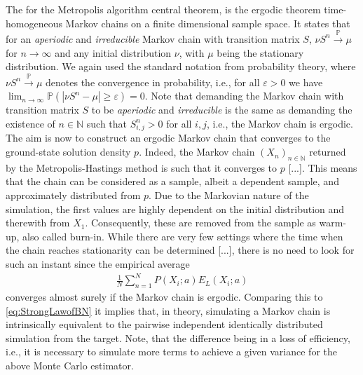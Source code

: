 \documentclass[11pt,a4paper]{article}
\numberwithin{equation}{section}
\begin{document}
%
The for the Metropolis algorithm central theorem, is the ergodic theorem time-homogeneous Markov chains on a finite dimensional sample space. 
%
It states that for an {\it aperiodic} and {\it irreducible} Markov chain with transition matrix $S$, $\nu S^n\overset{\mathbb{P}}{\longrightarrow}\mu$ for $n\to \infty$ and any initial distribution $\nu$, with $\mu$ being the stationary distribution.
%
We again used the standard notation from probability theory, where $\nu S^n\overset{\mathbb{P}}{\longrightarrow}\mu$  denotes the convergence in probability, i.e., for all $\varepsilon > 0 $ we have $\lim_{n\to \infty}\mathbb{P}(|\nu S^n - \mu|\geq\varepsilon)=0$. 
%
Note that demanding the Markov chain with transition matrix $S$ to be {\it aperiodic} and {\it irreducible} is the same as demanding the existence of $n\in\mathbb{N}$ such that $S^n_{i,j}>0$ for all $i,j$, i.e., the Markov chain is ergodic.\\  

%
The aim is now to construct an ergodic Markov chain that converges to the ground-state solution density $p$.
%
Indeed, the Markov chain $(X_{n})_{n\in\mathbb{N}}$ returned by the Metropolis-Hastings method is such that it converges to $p$ [...]. 
%
This means that the chain can be considered as a sample, albeit a dependent sample, and approximately distributed from $p$. 
%
Due to the Markovian nature of the simulation, the first values are highly dependent on the initial distribution and therewith from $X_1$.
%
Consequently, these are removed from the sample as warm-up, also called burn-in. 
%
While there are very few settings where the time when the chain reaches stationarity can be determined [...], there is no need to look for such an instant since the empirical average
\begin{align*}
\frac{1}{N}\sum_{n=1}^NP(X_i;a)E_L(X_i;a)
\end{align*}
converges almost surely if the Markov chain is ergodic. 
%
Comparing this to \eqref{eq:StrongLawofBN} it implies that, in theory, simulating a Markov chain is intrinsically equivalent to the pairwise independent identically distributed simulation from the target.
%
Note, that the difference being in a loss of efficiency, i.e., it is necessary to simulate more terms to achieve a given variance for the above Monte Carlo estimator. 
\end{document}
